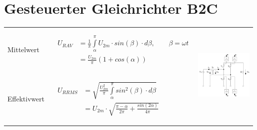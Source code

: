 \section{Gesteuerter Gleichrichter B2C}
{\renewcommand{\arraystretch}{5}
\begin{tabular}{|l|l|p{}}
	\cline{1-2}
  Mittelwert 
  	&\ $\begin{aligned}
  			U_{R AV} &= \frac{1}{\pi}\int\limits_{\alpha}^{\pi}U_{2m} \cdot sin(\beta) \cdot d\beta, \qquad \beta = \omega t\\
  						&= \frac{U_{2m}}{\pi}(1 + cos(\alpha))
  		\end{aligned}$ 
  		& \multirow{2}{*}{\includegraphics[width = \linewidth, height = 5cm]{./pictures/b2c.png}}\\ [4mm]
  \cline{1-2}
  Effektivwert 
  	&\ $\begin{aligned}
  		U_{R RMS} &= \sqrt{\frac{U_{2m}^2}{\pi}\int\limits_{\alpha}^{\pi}sin^2(\beta) \cdot d\beta}\\
  					&= U_{2m} \cdot \sqrt{\frac{\pi-\alpha}{2\pi}+\frac{sin(2\alpha)}{4\pi}}
  		\end{aligned}$ &\\ [7mm]
  \cline{1-2}
\end{tabular}}